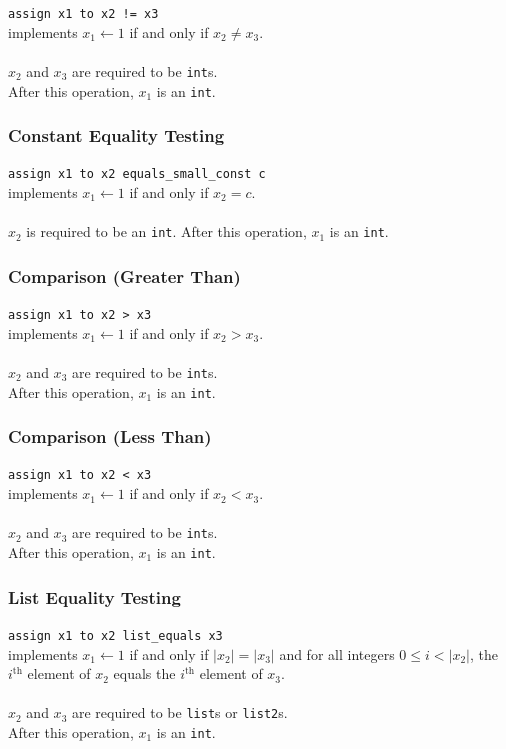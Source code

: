 \documentclass[11pt]{report}
\begin{document}
\texttt{assign x1 to x2 != x3} \\
implements $x_1 \leftarrow 1$ if and only if $x_2 \not= x_3$. \\ \\
$x_2$ and $x_3$ are required to be \texttt{int}s. \\
After this operation, $x_1$ is an \texttt{int}.

\subsubsection{Constant Equality Testing}

\texttt{assign x1 to x2 equals\_small\_const c} \\
implements $x_1 \leftarrow 1$ if and only if $x_2 = c$. \\ \\
$x_2$ is required to be an \texttt{int}.
After this operation, $x_1$ is an \texttt{int}.

\subsubsection{Comparison (Greater Than)}

\texttt{assign x1 to x2 > x3} \\
implements $x_1 \leftarrow 1$ if and only if $x_2 > x_3$. \\ \\
$x_2$ and $x_3$ are required to be \texttt{int}s. \\
After this operation, $x_1$ is an \texttt{int}.

\subsubsection{Comparison (Less Than)}

\texttt{assign x1 to x2 < x3} \\
implements $x_1 \leftarrow 1$ if and only if $x_2 < x_3$. \\ \\
$x_2$ and $x_3$ are required to be \texttt{int}s. \\
After this operation, $x_1$ is an \texttt{int}.

\subsubsection{List Equality Testing}

\texttt{assign x1 to x2 list\_equals x3} \\
implements $x_1 \leftarrow 1$ if and only if $|x_2| = |x_3|$ and for all integers $0 \le i < |x_2|$, the $i^{\textrm{th}}$ element of $x_2$ equals the $i^{\textrm{th}}$ element of $x_3$. \\ \\
$x_2$ and $x_3$ are required to be \texttt{list}s or \texttt{list2}s. \\
After this operation, $x_1$ is an \texttt{int}. 
\end{document}
